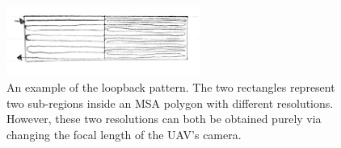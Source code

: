 \documentclass[conference]{IEEEtran}
\theoremstyle{plain}%
\begin{document}
\begin{figure}[!t]
\centering
\includegraphics[width=2.5in]{Loopback}
\caption{An example of the loopback pattern. The two rectangles represent two sub-regions inside an MSA polygon with different resolutions. However, these two resolutions can both be obtained purely via changing the focal length of the UAV's camera.}
\label{Loopback}
\end{figure}







\end{document}
